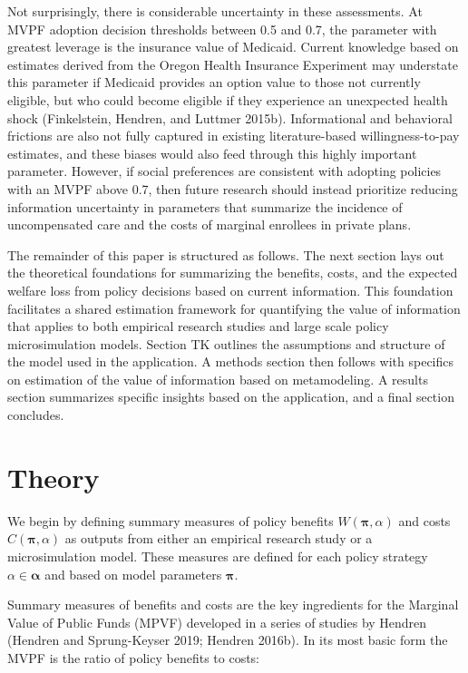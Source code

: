 \documentclass[
  10pt,
]{article}
\begin{document}
Not surprisingly, there is considerable uncertainty in these
assessments. At MVPF adoption decision thresholds between 0.5 and 0.7,
the parameter with greatest leverage is the insurance value of Medicaid.
Current knowledge based on estimates derived from the Oregon Health
Insurance Experiment may understate this parameter if Medicaid provides
an option value to those not currently eligible, but who could become
eligible if they experience an unexpected health shock (Finkelstein,
Hendren, and Luttmer 2015b). Informational and behavioral frictions are
also not fully captured in existing literature-based willingness-to-pay
estimates, and these biases would also feed through this highly
important parameter. However, if social preferences are consistent with
adopting policies with an MVPF above 0.7, then future research should
instead prioritize reducing information uncertainty in parameters that
summarize the incidence of uncompensated care and the costs of marginal
enrollees in private plans.

The remainder of this paper is structured as follows. The next section
lays out the theoretical foundations for summarizing the benefits,
costs, and the expected welfare loss from policy decisions based on
current information. This foundation facilitates a shared estimation
framework for quantifying the value of information that applies to both
empirical research studies and large scale policy microsimulation
models. Section TK outlines the assumptions and structure of the model
used in the application. A methods section then follows with specifics
on estimation of the value of information based on metamodeling. A
results section summarizes specific insights based on the application,
and a final section concludes.

\hypertarget{theory}{%
\section{Theory}\label{theory}}

We begin by defining summary measures of policy benefits
\(W(\boldsymbol{\pi},\alpha)\) and costs \(C(\boldsymbol{\pi},\alpha)\)
as outputs from either an empirical research study or a microsimulation
model. These measures are defined for each policy strategy
\(\alpha \in \boldsymbol{\alpha}\) and based on model parameters
\(\boldsymbol{\pi}\).

Summary measures of benefits and costs are the key ingredients for the
Marginal Value of Public Funds (MPVF) developed in a series of studies
by Hendren (Hendren and Sprung-Keyser 2019; Hendren 2016b). In its most
basic form the MVPF is the ratio of policy benefits to costs:
\end{document}
